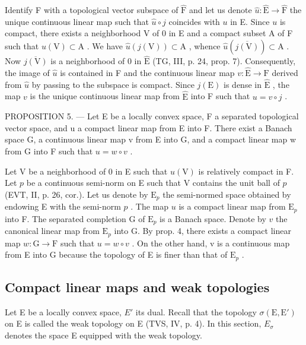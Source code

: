 Identify F with a topological vector subspace of \(\widehat{\mathrm{F}}\) and let us denote \(\widehat{u}\colon \widehat{\mathrm{E}}\to \widehat{\mathrm{F}}\) the unique continuous linear map such that \(\widehat{u}\circ j\) coincides with \(u\) in E. Since \(u\) is compact, there exists a neighborhood V of 0 in E and a compact subset A of F such that \(u(\mathrm{V})\subset \mathrm{A}\) . We have \(\widehat{u}(j(\mathrm{V}))\subset \mathrm{A}\) , whence \(\widehat{u} (\overline{j(\mathrm{V})})\subset \mathrm{A}\) . Now \(\overline{j(\mathrm{V})}\) is a neighborhood of 0 in \(\widehat{\mathrm{E}}\) (TG, III, p. 24, prop. 7). Consequently, the image of \(\widehat{u}\) is contained in F and the continuous linear map \(v\colon \widehat{\mathrm{E}}\rightarrow \mathrm{F}\) derived from \(\widehat{u}\) by passing to the subspace is compact. Since \(j(\mathrm{E})\) is dense in \(\widehat{\mathrm{E}}\) , the map \(v\) is the unique continuous linear map from \(\widehat{\mathrm{E}}\) into F such that \(u = v\circ j\) .

PROPOSITION 5. --- Let E be a locally convex space, F a separated topological vector space, and u a compact linear map from E into F. There exist a Banach space G, a continuous linear map v from E into G, and a compact linear map w from G into F such that \(u = w \circ v\) .

Let V be a neighborhood of 0 in E such that \(u(\mathrm{V})\) is relatively compact in F. Let \(p\) be a continuous semi-norm on E such that V contains the unit ball of \(p\) (EVT, II, p. 26, cor.). Let us denote by \(\mathrm{E}_p\) the semi-normed space obtained by endowing E with the semi-norm \(p\) . The map \(u\) is a compact linear map from \(\mathrm{E}_p\) into F. The separated completion G of \(\mathrm{E}_p\) is a Banach space. Denote by \(v\) the canonical linear map from \(\mathrm{E}_p\) into G. By prop. 4, there exists a compact linear map \(w: \mathrm{G} \to \mathrm{F}\) such that \(u = w \circ v\) . On the other hand, v is a continuous map from E into G because the topology of E is finer than that of \(\mathrm{E}_p\) .

\subsection{Compact linear maps and weak topologies}

Let E be a locally convex space, \(E'\) its dual. Recall that the topology \(\sigma(\mathrm{E},\mathrm{E}')\) on E is called the weak topology on E (TVS, IV, p. 4). In this section, \(E_{\sigma}\) denotes the space E equipped with the weak topology.

